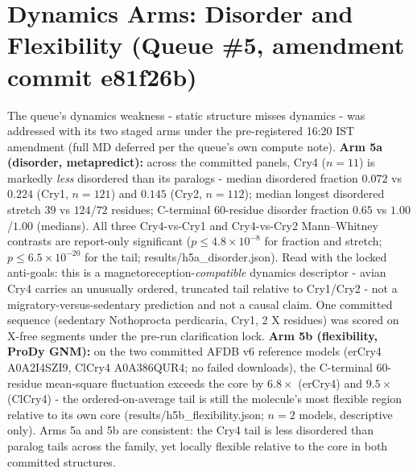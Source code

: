 \documentclass[12pt,a4paper]{article}
\begin{document}
\section{Dynamics Arms: Disorder and Flexibility (Queue \#5, amendment commit e81f26b)}
The queue's dynamics weakness - static structure misses dynamics - was addressed with its two staged arms under the pre-registered 16:20 IST amendment (full MD deferred per the queue's own compute note). \textbf{Arm 5a (disorder, metapredict):} across the committed panels, Cry4 ($n=11$) is markedly \emph{less} disordered than its paralogs - median disordered fraction $0.072$ vs $0.224$ (Cry1, $n=121$) and $0.145$ (Cry2, $n=112$); median longest disordered stretch $39$ vs $124$/$72$ residues; C-terminal 60-residue disorder fraction $0.65$ vs $1.00$/$1.00$ (medians). All three Cry4-vs-Cry1 and Cry4-vs-Cry2 Mann--Whitney contrasts are report-only significant ($p \le 4.8\times10^{-8}$ for fraction and stretch; $p \le 6.5\times10^{-20}$ for the tail; results/h5a\_disorder.json). Read with the locked anti-goals: this is a magnetoreception-\emph{compatible} dynamics descriptor - avian Cry4 carries an unusually ordered, truncated tail relative to Cry1/Cry2 - not a migratory-versus-sedentary prediction and not a causal claim. One committed sequence (sedentary Nothoprocta perdicaria, Cry1, 2 X residues) was scored on X-free segments under the pre-run clarification lock. \textbf{Arm 5b (flexibility, ProDy GNM):} on the two committed AFDB v6 reference models (erCry4 A0A2I4SZI9, ClCry4 A0A386QUR4; no failed downloads), the C-terminal 60-residue mean-square fluctuation exceeds the core by $6.8\times$ (erCry4) and $9.5\times$ (ClCry4) - the ordered-on-average tail is still the molecule's most flexible region relative to its own core (results/h5b\_flexibility.json; $n=2$ models, descriptive only). Arms 5a and 5b are consistent: the Cry4 tail is less disordered than paralog tails across the family, yet locally flexible relative to the core in both committed structures.
\end{document}
